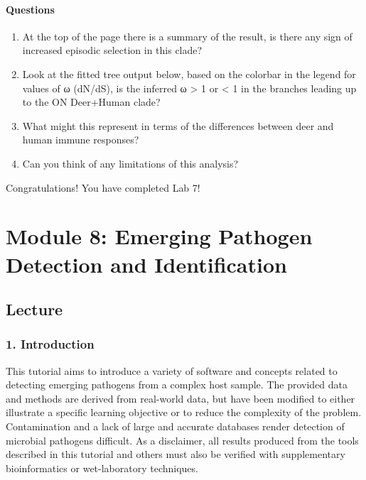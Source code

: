\documentclass[
]{book}
\providecommand{\tightlist}{%
  \setlength{\itemsep}{0pt}\setlength{\parskip}{0pt}}
\begin{document}
\subsubsection{Questions}\label{questions}

\begin{enumerate}
\def\labelenumi{\arabic{enumi}.}
\tightlist
\item
  At the top of the page there is a summary of the result, is there any sign of increased episodic selection in this clade?
\item
  Look at the fitted tree output below, based on the colorbar in the legend for values of ω (dN/dS), is the inferred ω \textgreater{} 1 or \textless{} 1 in the branches leading up to the ON Deer+Human clade?
\item
  What might this represent in terms of the differences between deer and human immune responses?
\item
  Can you think of any limitations of this analysis?
\end{enumerate}

Congratulations! You have completed Lab 7!

\chapter{Module 8: Emerging Pathogen Detection and Identification}\label{module-8-emerging-pathogen-detection-and-identification}

\section{Lecture}\label{lecture-7}

\subsection{1. Introduction}\label{introduction-3}

This tutorial aims to introduce a variety of software and concepts related to detecting emerging pathogens from a complex host sample. The provided data and methods are derived from real-world data, but have been modified to either illustrate a specific learning objective or to reduce the complexity of the problem. Contamination and a lack of large and accurate databases render detection of microbial pathogens difficult. As a disclaimer, all results produced from the tools described in this tutorial and others must also be verified with supplementary bioinformatics or wet-laboratory techniques.
\end{document}
